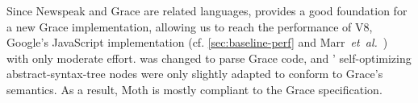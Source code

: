 Since Newspeak and Grace are related languages,
\SOMns provides a good foundation for a new Grace implementation,
allowing us to reach the performance of V8,
Google's JavaScript implementation
(cf. \cref{sec:baseline-perf} and Marr~\textit{et~al.}~\cite{Marr2016})
with only moderate effort.
\SOMns was changed to parse Grace code, and 
\SOMns' self-optimizing abstract-syntax-tree nodes were only slightly adapted to conform to Grace's semantics.
As a result, Moth is mostly compliant to the Grace specification.


%



